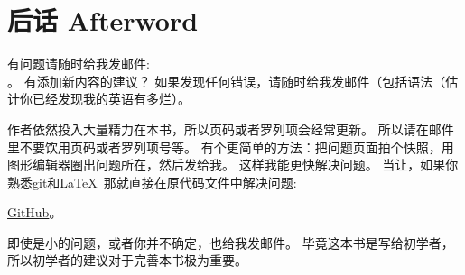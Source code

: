 \documentclass[UTF8,nofonts]{ctexart}
\begin{document}

\part*{后话 Afterword}


有问题请随时给我发邮件: \\
\GTT{\EMAILS}。
有添加新内容的建议？
如果发现任何错误，请随时给我发邮件（包括语法（估计你已经发现我的英语有多烂）。

作者依然投入大量精力在本书，所以页码或者罗列项会经常更新。
所以请在邮件里不要饮用页码或者罗列项号等。
有个更简单的方法：把问题页面拍个快照，用图形编辑器圈出问题所在，然后发给我。
这样我能更快解决问题。
当让，如果你熟悉git和\LaTeX\, 那就直接在原代码文件中解决问题: 

\href{http://go.yurichev.com/17089}{GitHub}。

即使是小的问题，或者你并不确定，也给我发邮件。
毕竟这本书是写给初学者，所以初学者的建议对于完善本书极为重要。
\end{document}

